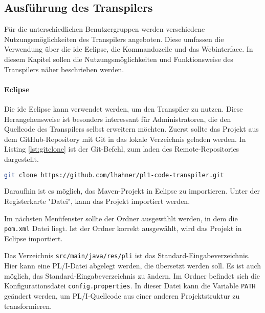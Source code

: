 \subsection{Ausführung des Transpilers}

Für die unterschiedlichen Benutzergruppen werden verschiedene Nutzungsmöglichkeiten des Transpilers angeboten. Diese umfassen die Verwendung über die \ac{ide} Eclipse, die Kommandozeile und das Webinterface. In diesem Kapitel sollen die Nutzungsmöglichkeiten und Funktionsweise des Transpilers näher beschrieben werden.

\paragraph{Eclipse}
Die \ac{ide} Eclipse kann verwendet werden, um den Transpiler zu nutzen. Diese Herangehensweise ist besonders interessant für Administratoren, die den Quellcode des Transpilers selbst erweitern möchten.
Zuerst sollte das Projekt aus dem GitHub-Repository mit Git in das lokale Verzeichnis geladen werden.
In Listing \ref{lst:gitclone} ist der Git-Befehl, zum laden des Remote-Repositories dargestellt. 

\begin{lstlisting}[language=bash, caption=Klonen des Transpiler Repositories, label={lst:gitclone}]
git clone https://github.com/lhahner/pl1-code-transpiler.git
\end{lstlisting}

Daraufhin ist es möglich, das Maven-Projekt in Eclipse zu importieren. Unter der Registerkarte "Datei", kann das Projekt importiert werden. %


Im nächsten Menüfenster sollte der Ordner ausgewählt werden, in dem die \verb+pom.xml+ Datei liegt. Ist der Ordner korrekt ausgewählt, wird das Projekt in Eclipse importiert. 

Das Verzeichnis \verb+src/main/java/res/pli+ ist das Standard-Eingabeverzeichnis. Hier kann eine PL/I-Datei abgelegt werden, die übersetzt werden soll. Es ist auch möglich, das Standard-Eingabeverzeichnis zu ändern. 
Im Ordner  befindet sich die Konfigurationsdatei 
\verb+config.properties+. In dieser Datei kann die Variable \verb+PATH+ geändert werden, 
um PL/I-Quellcode aus einer anderen Projektstruktur zu transformieren.

